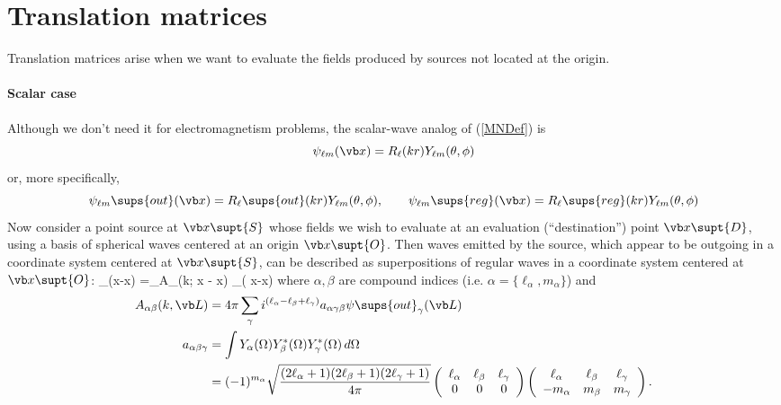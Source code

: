 \documentclass[letterpaper]{article}
\newcommand{\lm}{_{\ell m}}
\begin{document}
\newpage
\section{Translation matrices}
\label{TranslationMatrixSection}

Translation matrices arise when we want to evaluate the fields
produced by sources not located at the origin. 

\paragraph{Scalar case}
Although we don't need it for electromagnetism problems,
the scalar-wave analog of (\ref{MNDef}) is
$$ \psi\lm(\vb x) = R_\ell(kr)Y\lm(\theta,\phi)$$
or, more specifically,
$$ \psi\lm\sups{out}(\vb x) = R_\ell\sups{out}(kr)Y\lm(\theta,\phi),
   \qquad
   \psi\lm\sups{reg}(\vb x) = R_\ell\sups{reg}(kr)Y\lm(\theta,\phi)
$$
Now consider a point source at $\vb x\supt{S}$ whose fields we wish
to evaluate at an evaluation (``destination'') point $\vb x\supt{D}$,
using a basis of spherical waves centered at an origin $\vb x\supt{O}$.
Then waves emitted by the source, which appear to be outgoing in a
coordinate system centered at $\vb x\supt{S}$, can be described
as superpositions of regular waves in a coordinate system
centered at $\vb x\supt{O}$:
{ \psi{}_\alpha\big(\vb x-\vb x\big)
   =\sum_\beta A_{\alpha\beta}\big(k; \vb x - \vb x\big)
               \psi{}_\beta\big( \vb x-\vb x\big)
}
where $\alpha,\beta$ are compound indices 
(i.e. $\alpha=\{\ell_\alpha, m_\alpha\}$) and 
\begin{align*}
 A_{\alpha\beta}(k, \vb L)
&=4\pi 
  \sum_\gamma i^{(\ell_\alpha - \ell_\beta + \ell_\gamma)}
  a_{\alpha\gamma\beta} 
  \psi\sups{out}_\gamma(\vb L)
\\
a_{\alpha\beta\gamma}
&=\int Y_\alpha(\Omega) Y^*_\beta(\Omega) Y^*_\gamma(\Omega) \, d\Omega
\\
&=(-1)^{m_\alpha}
  \sqrt\frac{ (2\ell_\alpha+1)(2\ell_\beta+1) (2\ell_\gamma+1)}
            {4\pi}
  \left(\begin{array}{ccc} 
        \ell_\alpha & \ell_\beta & \ell_\gamma \\ 0 & 0 & 0 
        \end{array}\right)
  \left(\begin{array}{ccc} 
        \ell_\alpha & \ell_\beta & \ell_\gamma \\ 
          -m_\alpha & m_\beta    & m_\gamma
        \end{array}\right).
\end{align*}
\end{document}
